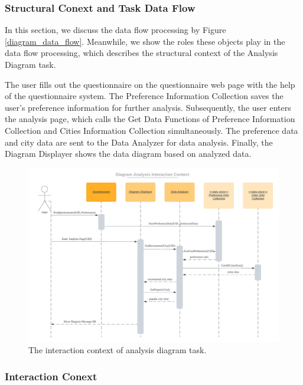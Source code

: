 \documentclass[conference]{IEEEtran}
\begin{document}
\subsubsection{\textbf{Structural Conext and Task Data Flow}}

\textbf{}

In this section, we discuss the data flow processing by Figure \ref{diagram_data_flow}. Meanwhile, we show the roles these objects play in the data flow processing, which describes the structural context of the Analysis Diagram task.

The user fills out the questionnaire on the questionnaire web page with the help of the questionnaire system. The Preference Information Collection saves the user's preference information for further analysis. Subsequently, the user enters the analysis page, which calls the Get Data Functions of Preference Information Collection and Cities Information Collection simultaneously. The preference data and city data are sent to the Data Analyzer for data analysis. Finally, the Diagram Displayer shows the data diagram based on analyzed data.


\begin{figure}[htbp]
\centerline{\includegraphics[width=1.0\textwidth]{diagram_interaction_context.pdf}}
\caption{The interaction context of analysis diagram task.}
\label{diagram_interaction}
\end{figure}

\subsubsection{\textbf{Interaction Conext }}
\end{document}
